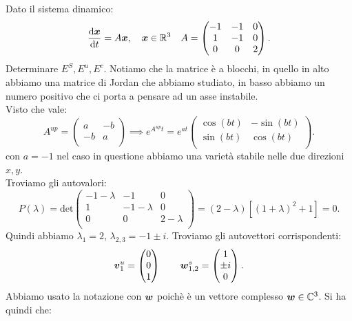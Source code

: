 \noindent 
\begin{exmp}
    Dato il sistema dinamico:
    \[
        \frac{\text{d} \boldsymbol{x}}{\text{d} t} = A \boldsymbol{x}, \quad \boldsymbol{x}\in \mathbb{R}^3 \quad  A = 
    \begin{pmatrix}
	-1  & -1  & 0  \\
	1  & -1 & 0 \\
	0 & 0 & 2 \\
    \end{pmatrix}
    .\] 
    Determinare $E^S, E^u, E^c$. Notiamo che la matrice è a blocchi, in quello in alto abbiamo una matrice di Jordan che abbiamo studiato, in basso abbiamo un numero positivo che ci porta a pensare ad un asse instabile.\\
    Visto che vale:
    \[
        A^{up} = 
    \begin{pmatrix}
	a & -b   \\
	-b & a \\
    \end{pmatrix} 
    \implies 
    e^{A^{up}t} = e^{at}
    \begin{pmatrix}
    \cos(bt) & - \sin(bt)  \\
    \sin(bt) & \cos(bt)  \\
    \end{pmatrix}
    .\] 
    con $a = -1$ nel caso in questione abbiamo una varietà stabile nelle due direzioni $x, y$.\\
    Troviamo gli autovalori:
    \[
	P(\lambda) = \text{det}
    \begin{pmatrix}
	-1-\lambda & -1 & 0 \\
	1 & -1-\lambda & 0 \\
	0 & 0 & 2-\lambda \\
    \end{pmatrix}
    =
    (2-\lambda) \left[(1+\lambda)^2 + 1\right] = 0
    .\] 
    Quindi abbiamo $\lambda_1 = 2$, $\lambda_{2,3} = -1 \pm i$.
    Troviamo gli autovettori corrispondenti:
    \[
        \boldsymbol{v}_1^u = \begin{pmatrix} 0 \\ 0 \\ 1 \end{pmatrix} \qquad 
	\boldsymbol{w}_{1,2}^s = \begin{pmatrix} 1 \\ \pm i \\ 0 \end{pmatrix}
    .\] 
    Abbiamo usato la notazione con $\boldsymbol{w}$ poichè è un vettore complesso $\boldsymbol{w} \in \mathbb{C}^3$. Si ha quindi che:

\end{exmp}
